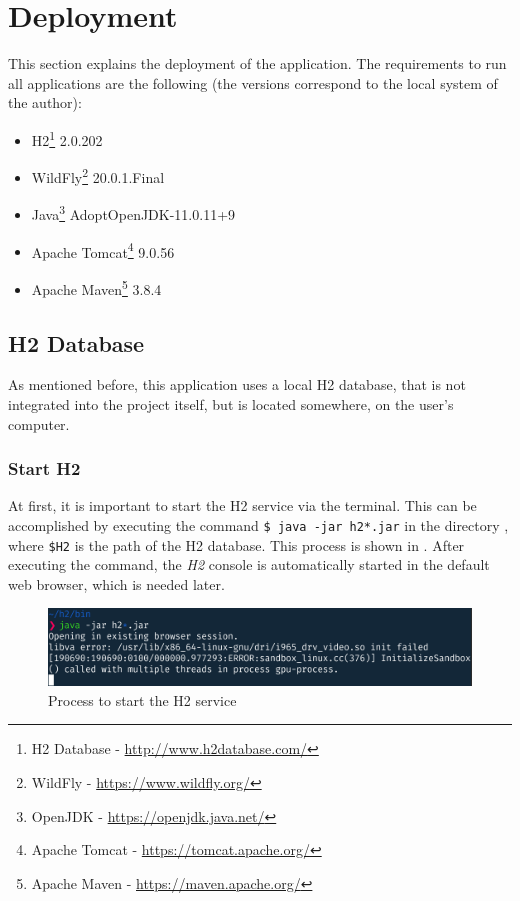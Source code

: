 \newpage
\section{Deployment}\label{sec:03_depl}
This section explains the deployment of the application.
The requirements to run all applications are the following (the versions correspond to the local system of the author):
\begin{itemize}
\item H2\footnote{H2 Database - \url{http://www.h2database.com/}} 2.0.202
\item WildFly\footnote{WildFly - \url{https://www.wildfly.org/}} 20.0.1.Final
\item Java\footnote{OpenJDK - \url{https://openjdk.java.net/}} AdoptOpenJDK-11.0.11+9
\item Apache Tomcat\footnote{Apache Tomcat - \url{https://tomcat.apache.org/}} 9.0.56
\item Apache Maven\footnote{Apache Maven - \url{https://maven.apache.org/}} 3.8.4
\end{itemize}


\subsection{H2 Database}\label{sec:03_depl_h2}
As mentioned before, this application uses a local H2 database, that is not integrated into the project itself, but is located somewhere, on the user's computer.

\subsubsection{Start H2}\label{sec:03_depl_h2_start}
At first, it is important to start the H2 service via the terminal. This can be accomplished by executing the command \texttt{\$ java -jar h2*.jar} in the directory , where \texttt{\$H2} is the path of the H2 database. This process is shown in . After executing the command, the \textit{H2} console is automatically started in the default web browser, which is needed later.
\begin{figure}[h]
\centering
\includegraphics[scale=0.23]{images/03_depl/h2_start}
\caption{Process to start the H2 service}
\label{fig:03_depl_h2_h2start}
\end{figure}

